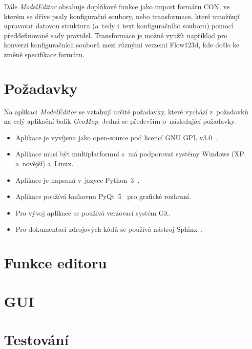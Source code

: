 \documentclass[FM,bw,DP]{tulthesis}
\begin{document}
Dále \textit{ModelEditor} obsahuje doplňkové funkce jako import formátu CON, ve kterém se dříve psaly konfigurační soubory, nebo transformace, které umožňují upravovat datovou strukturu (a~tedy i~text konfiguračního souboru) pomocí předdefinované sady pravidel. Transformace je možné využít například pro konverzi konfiguračních souborů mezi různými verzemi Flow123d, kde došlo ke změně specifikace formátu.


\section{Požadavky}

Na aplikaci \textit{ModelEditor} se vztahují určité požadavky, které vychází z~požadavků na celý aplikační balík \textit{GeoMop}. Jedná se především o~následující požadavky.

\begin{itemize}
\item Aplikace je vyvíjena jako open-source pod licencí \acrshort{GNU} \gls{GPL} v3.0~\cite{bib:gnu-gpl3}.
\item Aplikace musí být multiplatformní a~má podporovat systémy Windows (XP a~novější) a~Linux.
\item Aplikace je napsaná v~jazyce Python~3~\cite{bib:python3}.
\item Aplikace používá knihovnu PyQt~5~\cite{bib:pyqt5} pro grafické rozhraní.
\item Pro vývoj aplikace se používá verzovací systém Git.
\item Pro dokumentaci zdrojových kódů se používá nástroj Sphinx~\cite{bib:sphinx}.
\end{itemize}






\section{Funkce editoru}



\section{GUI}

\section{Testování}
\end{document}
